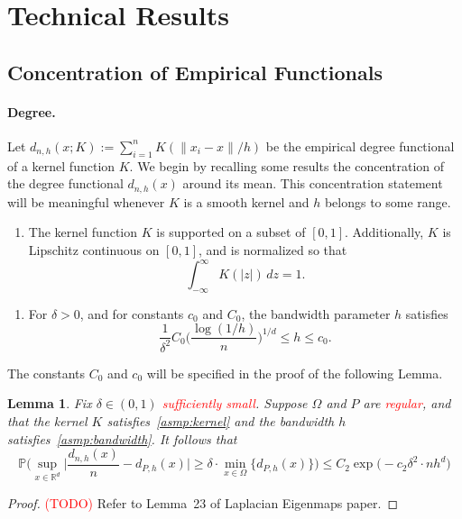 \documentclass{article}
\newcommand{\Reals}{\mathbb{R}}
\newcommand{\1}{\mathbf{1}}
\newcommand{\Rd}{\Reals^d}
\newcommand{\Pbb}{\mathbb{P}}
\theoremstyle{alden}
\theoremstyle{aldenthm}
\newtheorem{lemma}{Lemma}
\theoremstyle{definition}
\theoremstyle{remark}
\begin{document}
\section{Technical Results}

\subsection{Concentration of Empirical Functionals}

\paragraph{Degree.}
Let $d_{n,h}(x;K) := \sum_{i = 1}^{n} K(\|x_i - x\|/h)$ be the empirical degree functional of a kernel function $K$. We begin by recalling some results the concentration of the degree functional $d_{n,h}(x)$ around its mean. This concentration statement will be meaningful whenever $K$ is a smooth kernel and $h$ belongs to some range.
\begin{enumerate}[label=(K\arabic*)]
	\setcounter{enumi}{0}
	\item
	\label{asmp:kernel}
	The kernel function $K$ is supported on a subset of $[0,1]$. Additionally, $K$ is Lipschitz continuous on $[0,1]$, and is normalized so that
	\begin{equation*}
	\int_{-\infty}^{\infty} K(|z|) \,dz = 1.
	\end{equation*}
\end{enumerate}
\begin{enumerate}[label=(P\arabic*)]
	\setcounter{enumi}{0}
	\item
	\label{asmp:bandwidth}
	For $\delta > 0$, and for constants $c_0$ and $C_0$, the bandwidth parameter $h$ satisfies
	\begin{equation*}
	\frac{1}{\delta^2}C_0\biggl(\frac{\log(1/h)}{n}\biggr)^{1/d} \leq h \leq c_0.
	\end{equation*}
\end{enumerate}
The constants $C_0$ and $c_0$ will be specified in the proof of the following Lemma.
\begin{lemma}
	\label{lem:max_degree_deviation}
	Fix $\delta \in (0,1)$ \textcolor{red}{sufficiently small}. Suppose $\Omega$ and $P$ are \textcolor{red}{regular}, and that the kernel $K$ satisfies~\ref{asmp:kernel} and the bandwidth $h$ satisfies~\ref{asmp:bandwidth}. It follows that
	\begin{equation*}
	\Pbb\Biggl( \sup_{x \in \Rd} \biggl|\frac{d_{n,h}(x)}{n} - d_{P,h}(x)\biggr| \geq \delta \cdot \min_{x \in \Omega}\bigl\{d_{P,h}(x)\bigr\} \Biggr) \leq C_2\exp\bigl(-c_2 \delta^2 \cdot n h^d\bigr)
	\end{equation*}
\end{lemma}
\begin{proof}
	\textcolor{red}{(TODO)} Refer to Lemma~23 of Laplacian Eigenmaps paper. 
\end{proof}
\end{document}
